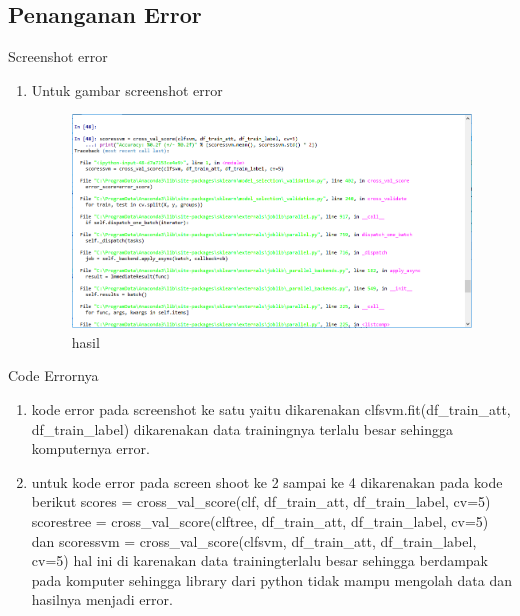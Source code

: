 \subsection{Penanganan Error}
Screenshot error
\begin{enumerate}
\item  Untuk gambar screenshot error
\begin{figure}[ht]
\centering
\includegraphics[scale=0.5]{figures/1174051/3/error/error.PNG}
\caption{hasil}
\label{contoh}
\end{figure}
\end{enumerate}

Code Errornya 
\begin{enumerate}
\item kode error pada screenshot ke satu yaitu dikarenakan clfsvm.fit(df\_train\_att, df\_train\_label) dikarenakan data trainingnya terlalu besar sehingga komputernya error.
\item untuk kode error pada screen shoot ke 2 sampai ke 4 dikarenakan pada kode berikut  scores = cross\_val\_score(clf, df\_train\_att, df\_train\_label, cv=5) scorestree = cross\_val\_score(clftree, df\_train\_att, df\_train\_label, cv=5) dan  
scoressvm = cross\_val\_score(clfsvm, df\_train\_att, df\_train\_label, cv=5) hal ini di karenakan data trainingterlalu besar sehingga berdampak pada komputer sehingga library dari python tidak mampu mengolah data dan hasilnya menjadi error. 
\end{enumerate}

